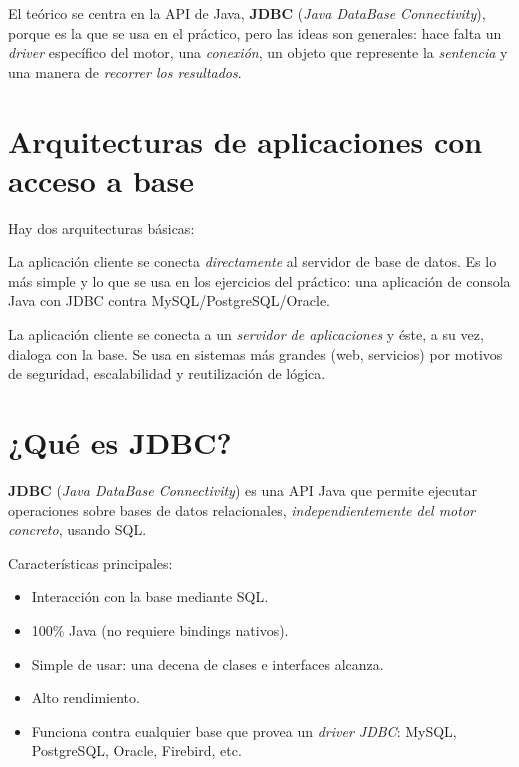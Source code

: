 \documentclass[11pt,a4paper]{article}
\begin{document}
El teórico se centra en la API de Java, \textbf{JDBC} (\emph{Java
DataBase Connectivity}), porque es la que se usa en el práctico, pero
las ideas son generales: hace falta un \emph{driver} específico del
motor, una \emph{conexión}, un objeto que represente la
\emph{sentencia} y una manera de \emph{recorrer los resultados}.

\section{Arquitecturas de aplicaciones con acceso a base}

Hay dos arquitecturas básicas:

\begin{description}[leftmargin=2.4cm,style=nextline]
    \item[\textbf{Dos capas}] La aplicación cliente se conecta
    \emph{directamente} al servidor de base de datos. Es lo más
    simple y lo que se usa en los ejercicios del práctico: una
    aplicación de consola Java con JDBC contra MySQL/PostgreSQL/Oracle.

    \item[\textbf{Tres capas}] La aplicación cliente se conecta a un
    \emph{servidor de aplicaciones} y éste, a su vez, dialoga con la
    base. Se usa en sistemas más grandes (web, servicios) por motivos
    de seguridad, escalabilidad y reutilización de lógica.
\end{description}

\section{¿Qué es JDBC?}

\textbf{JDBC} (\emph{Java DataBase Connectivity}) es una API Java que
permite ejecutar operaciones sobre bases de datos relacionales,
\emph{independientemente del motor concreto}, usando SQL.

Características principales:

\begin{itemize}
    \item Interacción con la base mediante SQL.
    \item 100\% Java (no requiere bindings nativos).
    \item Simple de usar: una decena de clases e interfaces alcanza.
    \item Alto rendimiento.
    \item Funciona contra cualquier base que provea un \emph{driver
    JDBC}: MySQL, PostgreSQL, Oracle, Firebird, etc.
\end{itemize}
\end{document}
